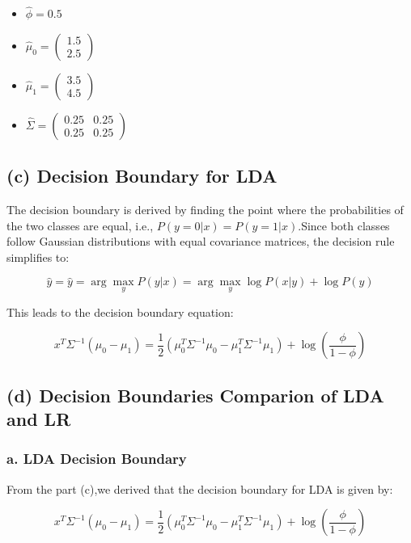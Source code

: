 \documentclass[12pt]{article}
\begin{document}
\begin{itemize}
    \item $\hat{\phi} = 0.5$
    \item $\hat{\mu}_0 = \begin{pmatrix} 1.5 \\ 2.5 \end{pmatrix}$
    \item $\hat{\mu}_1 = \begin{pmatrix} 3.5 \\ 4.5 \end{pmatrix}$
    \item $\hat{\Sigma} = \begin{pmatrix} 0.25 & 0.25 \\ 0.25 & 0.25 \end{pmatrix}$
\end{itemize}
\newpage
\subsection*{(c) Decision Boundary for LDA}

The decision boundary is derived by finding the point where the probabilities of the two classes are equal, i.e., $P(y=0|x)=P(y=1|x)$.Since both classes follow Gaussian distributions with equal covariance matrices, the decision rule simplifies to:

\[
    \hat y=\hat{y} = \arg\max_y P(y | x) = \arg\max_y \log P(x | y) + \log P(y)
\]

This leads to the decision boundary equation:

\[
x^T \Sigma^{-1} (\mu_0 - \mu_1) = \frac{1}{2} (\mu_0^T \Sigma^{-1} \mu_0 - \mu_1^T \Sigma^{-1} \mu_1) + \log \left( \frac{\phi}{1 - \phi} \right)
\]

\subsection*{(d) Decision Boundaries Comparion of LDA and LR}

\subsubsection*{a. LDA Decision Boundary}

From the part (c),we derived that the decision boundary for LDA is given by:

\[
    x^T \Sigma^{-1} (\mu_0 - \mu_1) = \frac{1}{2} (\mu_0^T \Sigma^{-1} \mu_0 - \mu_1^T \Sigma^{-1} \mu_1) + \log \left( \frac{\phi}{1 - \phi} \right)
\]
\end{document}
